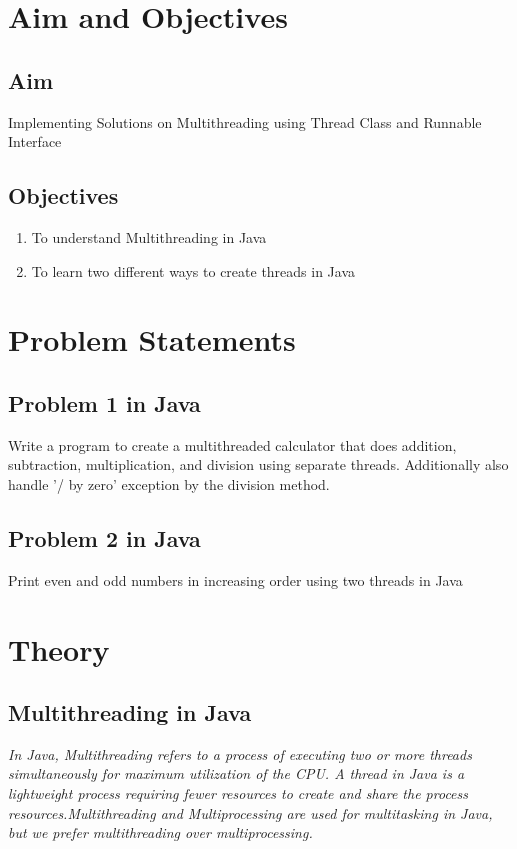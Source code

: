 \documentclass[11pt]{article}
\begin{document}
\tableofcontents
\thispagestyle{empty}
\clearpage


\setcounter{page}{1}

\section{Aim and Objectives}
\subsection*{Aim}
Implementing Solutions on Multithreading using Thread Class and Runnable Interface
\subsection*{Objectives}
\begin{enumerate}
	\item To understand Multithreading in Java
	\item To learn two different ways to create threads in Java
\end{enumerate}
\section{Problem Statements}

\subsection{Problem 1 in Java}
Write a program to create a multithreaded calculator that does addition, subtraction,
multiplication, and division using separate threads.
Additionally also handle '/ by zero' exception by the division method.

\subsection{Problem 2 in Java}
Print even and odd numbers in increasing order using two threads in Java

\section{Theory}
\subsection{Multithreading in Java}
\textit{
In Java, Multithreading refers to a process of executing two or more threads simultaneously for maximum utilization of the CPU. A thread in Java is a lightweight process requiring fewer resources to create and share the process resources.Multithreading and Multiprocessing are used for multitasking in Java, but we prefer multithreading over multiprocessing. 
}
\end{document}
